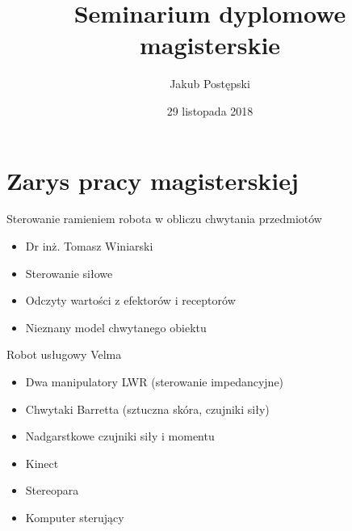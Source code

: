 \documentclass{beamer}
\begin{document}
\title{Seminarium dyplomowe magisterskie}
\author{Jakub Postępski}
\date{29 listopada 2018}

\frame{\titlepage}

\section{Zarys pracy magisterskiej}
\begin{frame}{Sterowanie ramieniem robota w obliczu chwytania przedmiotów}

\begin{itemize}
\item Dr inż. Tomasz Winiarski
\end{itemize}

\begin{itemize}
\item Sterowanie siłowe
\item Odczyty wartości z efektorów i receptorów
\item Nieznany model chwytanego obiektu
\end{itemize}
\end{frame}


\begin{frame}{Robot usługowy Velma}
\begin{itemize}
\item Dwa manipulatory LWR (sterowanie impedancyjne)
\item Chwytaki Barretta (sztuczna skóra, czujniki siły)
\item Nadgarstkowe czujniki siły i momentu
\item Kinect
\item Stereopara
\item Komputer sterujący
\end{itemize}
\end{frame}
\end{document}
